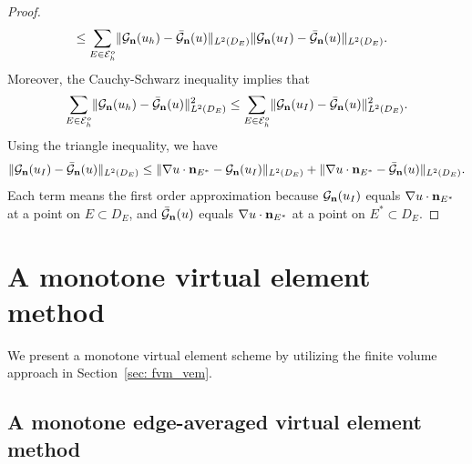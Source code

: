 \documentclass[a4paper]{article}
\theoremstyle{plain}
\theoremstyle{definition}
\numberwithin{equation}{section}
\newcommand{\bn}{{\bf n}}
\newcommand{\Eho}{\mathcal{E}_h^o}
\newcommand{\norm}[1]{\lVert #1\rVert}
\begin{document}
\begin{proof}
\begin{align*}
&\leq\sum_{E\in\Eho}\norm{\mathcal{G}_{\bn}(u_h)-\bar{\mathcal{G}}_{\bn}(u)}_{L^2(D_E)}\norm{\mathcal{G}_{\bn}(u_I)-\bar{\mathcal{G}}_{\bn}(u)}_{L^2(D_E)}.
\end{align*}
Moreover, the Cauchy-Schwarz inequality implies that
\begin{equation*}
\sum_{E\in\Eho}\norm{\mathcal{G}_{\bn}(u_h)-\bar{\mathcal{G}}_{\bn}(u)}^2_{L^2(D_E)}\leq\sum_{E\in\Eho}\norm{\mathcal{G}_{\bn}(u_I)-\bar{\mathcal{G}}_{\bn}(u)}^2_{L^2(D_E)}.
\end{equation*}
Using the triangle inequality, we have
\begin{equation*}
\norm{\mathcal{G}_{\bn}(u_I)-\bar{\mathcal{G}}_{\bn}(u)}_{L^2(D_E)}\leq \norm{\nabla u\cdot\bn_{E^*}-\mathcal{G}_{\bn}(u_I)}_{L^2(D_E)}+ \norm{\nabla u\cdot \bn_{E^*}-\bar{\mathcal{G}}_{\bn}(u)}_{L^2(D_E)}.
\end{equation*}
Each term means the first order approximation because $\mathcal{G}_{\bn}(u_I)$ equals $\nabla u\cdot\bn_{E^*}$ at a point on $E\subset D_E$, and $\bar{\mathcal{G}}_{\bn}(u)$ equals $\nabla u\cdot\bn_{E^*}$ at a point on $E^*\subset D_E$.
\end{proof}





\section{A monotone virtual element method}\label{sec: MEAVE}



We present a monotone virtual element scheme by utilizing the finite volume approach in Section~\ref{sec: fvm_vem}.



\subsection{A monotone edge-averaged virtual element method}
\end{document}
